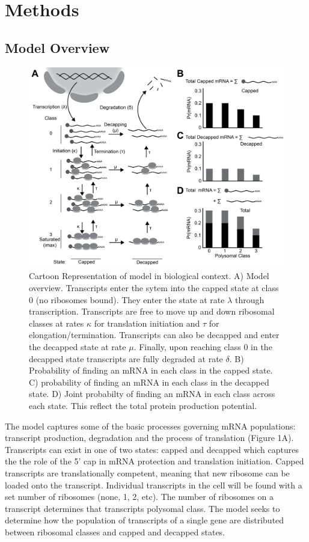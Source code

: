 \documentclass[review]{elsarticle}
\begin{document}
\section{Methods}\label{sec:description}
\subsection{Model Overview}
\pagebreak
\begin{figure}[!ht]
\centering
\includegraphics[width=150mm]{Images/Figure1_biomodel_V3.png}
\caption{Cartoon Representation of model in biological context. A) Model overview. Transcripts enter the sytem into the capped state at class 0 (no ribosomes bound). They enter the state at rate $\lambda$ through transcription. Transcripts are free to move up and down ribosomal classes at rates $\kappa$ for translation initiation and $\tau$ for elongation/termination. Transcripts can also be decapped and enter the decapped state at rate $\mu$. Finally, upon reaching class 0 in the decapped state transcripts are fully degraded at rate $\delta$. B) Probability of finding an mRNA in each class in the capped state. C) probability of finding an mRNA in each class in the decapped state. D) Joint probabilty of finding an mRNA in each class across each state. This reflect the total protein production potential.}
\end{figure}
\pagebreak


The model captures some of the basic processes governing mRNA populations: transcript production, degradation and the process of translation (Figure 1A).
Transcripts can exist in one of two states: capped and decapped which captures the the role of the 5' cap in mRNA protection and translation initiation. 
Capped transcripts are translationally competent, meaning that new ribosome can be loaded onto the transcript. 
Individual transcripts in the cell will be found with a set number of ribosomes (none, 1, 2, etc).
The number of ribosomes on a transcript determines that transcripts polysomal class.
The model seeks to determine how the population of transcripts of a single gene are distributed between ribosomal classes and capped and decapped states.
\end{document}

